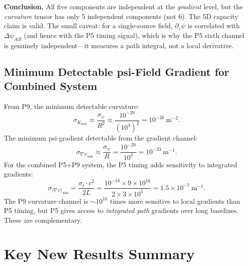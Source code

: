 \documentclass[aps,prd,twocolumn,superscriptaddress,nofootinbib]{revtex4-2}
\begin{document}
\textbf{Conclusion.}  All five components are independent at the
\emph{gradient} level, but the \emph{curvature} tensor has only 5
independent components (not 6).  The 5D capacity claim is valid.
The small caveat: for a single-source field, $\partial_z\psi$ is
correlated with $\Delta\psi_{AB}$ (and hence with the P5 timing signal),
which is why the P5 sixth channel is genuinely independent---it measures
a path integral, not a local derivative.

\subsection{Minimum Detectable psi-Field Gradient for Combined System}

From P9, the minimum detectable curvature:
\begin{equation}
\sigma_{K_{\min}} \approx \frac{\sigma_\psi}{R^2} \approx \frac{10^{-20}}{(10^3)^2}
= 10^{-26}~\text{m}^{-2}.
\end{equation}
The minimum psi-gradient detectable from the gradient channel:
\begin{equation}
\sigma_{\nabla\psi_{\min}} \approx \frac{\sigma_\psi}{R} = \frac{10^{-20}}{10^3}
= 10^{-23}~\text{m}^{-1}.
\end{equation}
For the combined P5+P9 system, the P5 timing adds sensitivity to integrated
gradients:
\begin{equation}
\sigma_{\langle\nabla\psi\rangle_{\min}} = \frac{\sigma_t \cdot c^2}{2L}
= \frac{10^{-18}\times 9\times 10^{16}}{2\times 3\times 10^5}
= 1.5\times 10^{-7}~\text{m}^{-1}.
\end{equation}
The P9 curvature channel is $\sim 10^{16}$ times more sensitive to local
gradients than P5 timing, but P5 gives access to \emph{integrated path}
gradients over long baselines.  These are complementary.

\section{Key New Results Summary}
\label{sec:summary}
\end{document}
